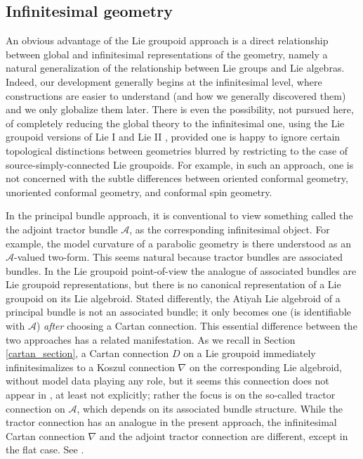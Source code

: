 \documentclass[leqno,12pt]{amsart} %
\begin{document}
\subsection{Infinitesimal geometry} An obvious advantage of the Lie groupoid approach is a
direct relationship between global and infinitesimal representations of the geometry,
namely a natural generalization of the relationship between Lie groups and Lie
algebras. Indeed, our development generally begins at the infinitesimal level, where
constructions are easier to understand (and how we generally discovered them) and we only
globalize them later. There is even the possibility, not pursued here, of completely
reducing the global theory to the infinitesimal one, using the Lie groupoid versions of
Lie I and Lie II \cite{Crainic_Fernandes_11}, provided one is happy to ignore certain
topological distinctions between geometries blurred by restricting to the case of
source-simply-connected Lie groupoids. For example, in such an approach, one is not
concerned with the subtle differences between oriented conformal geometry, unoriented
conformal geometry, and conformal spin geometry.

In the principal bundle approach, it is conventional to view something called the the
  adjoint tractor bundle ${\mathcal A}$, as the corresponding infinitesimal object. For
example, the model curvature of a parabolic geometry is there understood as an
${\mathcal A}$-valued two-form. This seems natural because tractor bundles are associated
bundles. In the Lie groupoid point-of-view the analogue of associated bundles are Lie
groupoid representations, but there is no canonical representation of a Lie groupoid on
its Lie algebroid. Stated differently, the Atiyah Lie algebroid of a principal bundle is
not an associated bundle; it only becomes one (is identifiable with ${\mathcal A}$) {\em
  after} choosing a Cartan connection. This essential difference between the two
approaches has a related manifestation. As we recall in Section \ref{cartan_section}, a
Cartan connection $D$ on a Lie groupoid immediately infinitesimalizes to a Koszul
connection $\nabla $ on the corresponding Lie algebroid, without model data playing any
role, but it seems this connection does not appear in \cite{Cap_Slovak_09}, at least not
explicitly; rather the focus is on the so-called tractor connection on ${\mathcal A}$,
which depends on its associated bundle structure. While the tractor connection has an
analogue in the present approach, the infinitesimal Cartan connection $\nabla $ and the
adjoint tractor connection are different, except in the flat case. See
.
\end{document}
